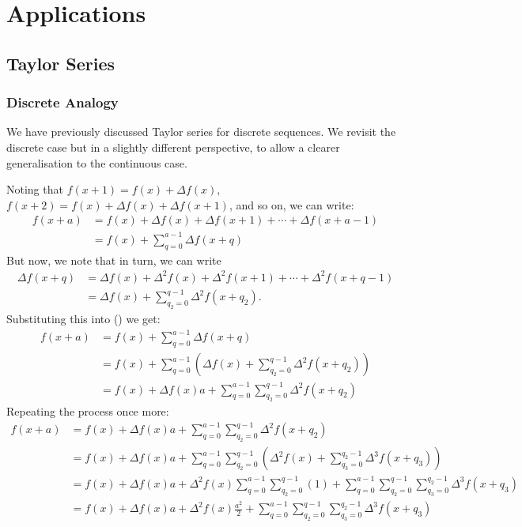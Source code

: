 \documentclass{article}
\theoremstyle{definition}
\begin{document}
\newpage
\section{Applications}
\subsection{Taylor Series}
\subsubsection{Discrete Analogy}
We have previously discussed Taylor series for discrete sequences. We revisit the discrete case but in a slightly different perspective, to allow a clearer generalisation to the continuous case.\par
Noting that $f(x+1)=f(x)+\Delta f(x)$, $f(x+2)=f(x)+\Delta f(x)+\Delta f(x+1)$, and so on, we can write:
\begin{align*}
	f(x+a)&=f(x)+\Delta f(x)+\Delta f(x+1)+\cdots+\Delta f(x+a-1)\\
	&=f(x)+\sum_{q=0}^{a-1}\Delta f(x+q)
\end{align*}
But now, we note that in turn, we can write 
\begin{align*}
	\Delta f(x+q)&=\Delta f(x)+\Delta^2f(x)+\Delta^2f(x+1)+\cdots+\Delta^2f(x+q-1)\\
	&=\Delta f(x)+\sum_{q_2=0}^{q-1}\Delta^2f(x+q_2).
\end{align*}
Substituting this into () we get:
\begin{align*}
	f(x+a)&=f(x)+\sum_{q=0}^{a-1}\Delta f(x+q)\\
	&=f(x)+\sum_{q=0}^{a-1}\left(\Delta f(x)+\sum_{q_2=0}^{q-1}\Delta^2f(x+q_2)\right)\\
	&=f(x)+\Delta f(x)a+\sum_{q=0}^{a-1}\sum_{q_2=0}^{q-1}\Delta^2f(x+q_2)
\end{align*}
Repeating the process once more:
\begin{align*}
	f(x+a)&=f(x)+\Delta f(x)a+\sum_{q=0}^{a-1}\sum_{q_2=0}^{q-1}\Delta^2f(x+q_2)\\
	&=f(x)+\Delta f(x)a+\sum_{q=0}^{a-1}\sum_{q_2=0}^{q-1}\left(\Delta^2f(x)+\sum_{q_3=0}^{q_2-1}\Delta^3f(x+q_3)\right)\\
	&=f(x)+\Delta f(x)a+\Delta^2f(x)\sum_{q=0}^{a-1}\sum_{q_2=0}^{q-1}(1)+\sum_{q=0}^{a-1}\sum_{q_2=0}^{q-1}\sum_{q_3=0}^{q_2-1}\Delta^3f(x+q_3)\\
	&=f(x)+\Delta f(x)a+\Delta^2f(x)\frac{a^{\underline{2}}}{2}+\sum_{q=0}^{a-1}\sum_{q_2=0}^{q-1}\sum_{q_3=0}^{q_2-1}\Delta^3f(x+q_3)
\end{align*}
\end{document}
